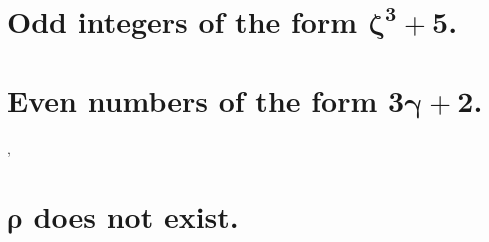 \documentclass[preview]{standalone}
\begin{document}
\section{Odd integers of the form $\bm{\zeta ^3 + 5}$.}

%
\pagebreak


\section{Even numbers of the form $\bm{3 \gamma + 2}$.}

\sep


\section{$\bm{\rho}$ does not exist.}

\pagebreak
\thispagestyle{empty}
\end{document}
